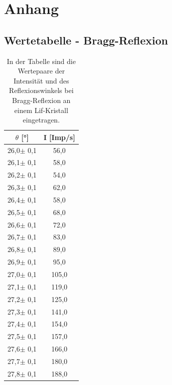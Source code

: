 \documentclass[titlepage = firstcover]{scrartcl}
\begin{document}
        \FloatBarrier



            \newpage
            \section{Anhang}
            \FloatBarrier
            \subsection{Wertetabelle - Bragg-Reflexion}
            \begin{table}
              \centering
              \caption{In der Tabelle sind die Wertepaare der Intensität und des Reflexionswinkels bei Bragg-Reflexion an einem Lif-Kristall eingetragen.}

              \begin{tabular} {c c}
                \toprule
                {$\theta$ [°]} & {I [Imp/s]}  \\
                \midrule
                26,0$\pm$ 0,1 & 	56,0    \\
                26,1$\pm$ 0,1 & 	58,0    \\
                26,2$\pm$ 0,1 & 	54,0    \\
                26,3$\pm$ 0,1 & 	62,0    \\
                26,4$\pm$ 0,1 & 	58,0    \\
                26,5$\pm$ 0,1 & 	68,0    \\
                26,6$\pm$ 0,1 & 	72,0    \\
                26,7$\pm$ 0,1 & 	83,0    \\
                26,8$\pm$ 0,1 & 	89,0    \\
                26,9$\pm$ 0,1 & 	95,0    \\
                27,0$\pm$ 0,1 & 	105,0   \\
                27,1$\pm$ 0,1 & 	119,0   \\
                27,2$\pm$ 0,1 & 	125,0   \\
                27,3$\pm$ 0,1 & 	141,0   \\
                27,4$\pm$ 0,1 & 	154,0   \\
                27,5$\pm$ 0,1 & 	157,0   \\
                27,6$\pm$ 0,1 & 	166,0   \\
                27,7$\pm$ 0,1 & 	180,0   \\
                27,8$\pm$ 0,1 & 	188,0   \\

\end{tabular}
\end{table}
\end{document}
